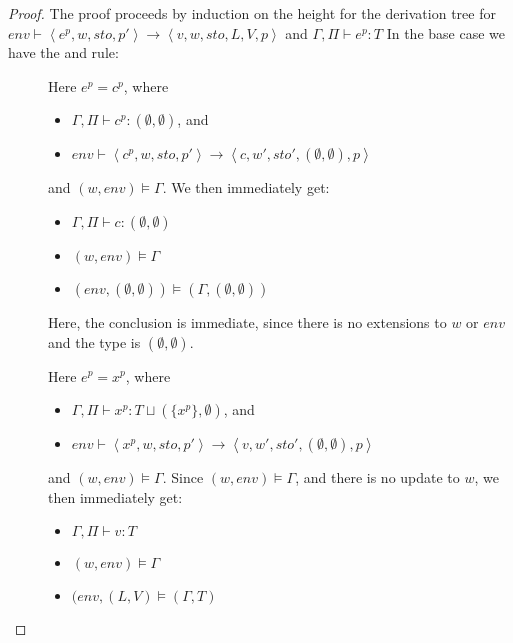 \documentclass[../../master.tex]{subfiles}
\begin{document}
\begin{proof}
	The proof proceeds by induction on the height for the derivation tree for $env\vdash\left\langle e^p,w,sto,p'\right\rangle\rightarrow\left\langle v,w,sto,L,V,p\right\rangle$ and $\Gamma,\Pi\vdash e^p:T$
	In the base case we have the  and  rule:
	\begin{description}
		\item[] Here $e^p=c^p$, where
			\begin{itemize}
				\item $\Gamma,\Pi\vdash c^p : (\emptyset,\emptyset)$, and 
				\item $env\vdash\left\langle c^p,w,sto,p'\right\rangle\rightarrow\left\langle c,w',sto',(\emptyset,\emptyset),p\right\rangle$
			\end{itemize}
			and $(w,env)\models\Gamma$.
			We then immediately get:
			\begin{itemize}
				\item $\Gamma,\Pi\vdash c : (\emptyset,\emptyset)$
				\item $(w,env)\models\Gamma$
				\item $(env,(\emptyset,\emptyset))\models (\Gamma,(\emptyset,\emptyset))$
			\end{itemize}
			Here, the conclusion is immediate, since there is no extensions to $w$ or $env$ and the type is $(\emptyset,\emptyset)$.

		\item[] Here $e^p=x^p$, where
			\begin{itemize}
				\item $\Gamma,\Pi\vdash x^p : T\sqcup (\{x^p\},\emptyset)$, and 
				\item $env\vdash\left\langle x^p,w,sto,p'\right\rangle\rightarrow\left\langle v,w',sto',(\emptyset,\emptyset),p\right\rangle$
			\end{itemize}
			and $(w,env)\models\Gamma$.
			Since $(w,env)\models\Gamma$, and there is no update to $w$, we then immediately get:
			\begin{itemize}
				\item $\Gamma,\Pi\vdash v : T$
				\item $(w,env)\models\Gamma$
				\item $(env,(L,V)\models (\Gamma,T)$
			\end{itemize}
	\end{description}


\end{proof}
\end{document}
